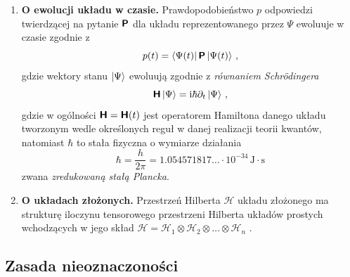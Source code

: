 \documentclass{myclass}
\begin{document}
\begin{enumerate}[label=\Roman*.]
    \item \textbf{O ewolucji układu w czasie.} Prawdopodobieństwo \(p\) odpowiedzi twierdzącej na
    pytanie \(\boldsymbol{\mathsf{P}}\) dla układu reprezentowanego przez \(\Psi\) ewoluuje w czasie zgodnie z
    \begin{equation*}
        p(t) = \bra{\Psi(t)}\boldsymbol{\mathsf{P}}\ket{\Psi(t)}\,,
    \end{equation*}
    gdzie wektory stanu \(\ket{\Psi}\) ewoluują zgodnie z \textit{równaniem Schr\"{o}dingera}
    \begin{equation*}
        \boldsymbol{\mathsf{H}}\ket{\Psi} = \mathrm{i}\hbar\partial_t\ket{\Psi}\,,
    \end{equation*}
    gdzie w ogólności \(\boldsymbol{\mathsf{H}} = \boldsymbol{\mathsf{H}}(t)\) jest operatorem Hamiltona danego układu tworzonym
    wedle określonych reguł w danej realizacji teorii kwantów, natomiast \(\hbar\) to stała fizyczna
    o wymiarze działania
    \begin{equation*}
        \hbar = \frac{h}{2\pi} = 1.054571817\ldots \cdot 10^{-34}\,\text{J}\cdot\text{s}
    \end{equation*}
    zwana \textit{zredukowaną stałą Plancka}.
    
    \item \textbf{O układach złożonych.} Przestrzeń Hilberta \(\mathscr{H}\) układu złożonego ma
    strukturę iloczynu tensorowego przestrzeni Hilberta układów prostych wchodzących w jego skład
    \(\mathscr{H}=\mathscr{H}_1\otimes\mathscr{H}_2\otimes\ldots\otimes\mathscr{H}_n\) .

\end{enumerate}

\subsection{Zasada nieoznaczoności}
\end{document}
